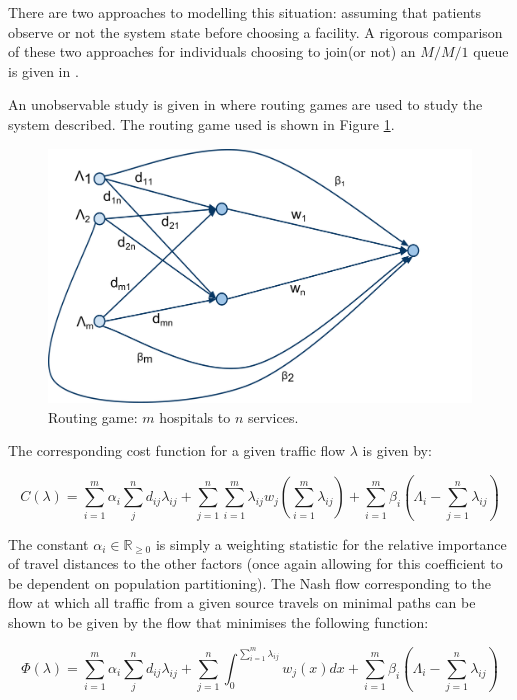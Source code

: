 \documentclass[a4paper,11pt]{article}
\begin{document}
There are two approaches to modelling this situation: assuming that patients observe or not the system state before choosing a facility.
A rigorous comparison of these two approaches for individuals choosing to join(or not) an $M/M/1$ queue is given in \cite{shone2013comparisons}.

An unobservable study is given in \cite{Knight2013} where routing games \cite{Roughgarden2005} are used to study the system described.
The routing game used is shown in Figure \ref{fig:routinggame}.

\begin{figure}[!hbtp]
\begin{center}
\includegraphics[width=.7\textwidth]{./Images/Hospital_Routing_Game.pdf}
\end{center}
\caption{Routing game: $m$ hospitals to $n$ services.}\label{fig:routinggame}
\end{figure}

The corresponding cost function for a given traffic flow $\lambda$ is given by:

\begin{equation}
C(\lambda)=\sum_{i=1}^m\alpha_i\sum_{j}^nd_{ij}\lambda_{ij}+\sum_{j=1}^n\sum_{i=1}^m\lambda_{ij}w_j\left(\sum_{i=1}^m\lambda_{ij}\right)+\sum_{i=1}^m\beta_i\left(\Lambda_i-\sum_{j=1}^n\lambda_{ij}\right)
\label{C}\end{equation}

The constant $\alpha_i\in\mathbb{R}_{\geq0}$ is simply a weighting statistic for the relative importance of travel distances to the other factors (once again allowing for this coefficient to be dependent on population partitioning).
The Nash flow corresponding to the flow at which all traffic from a given source travels on minimal paths can be shown to be given by the flow that minimises the following function:

\begin{equation}
\Phi(\lambda)=\sum_{i=1}^m\alpha_i\sum_{j}^nd_{ij}\lambda_{ij}+\sum_{j=1}^n\int_0^{\sum_{i=1}^m\lambda_{ij}}w_j(x)dx+\sum_{i=1}^m\beta_i\left(\Lambda_i-\sum_{j=1}^n\lambda_{ij}\right)
\label{Phi}\end{equation}
\end{document}
